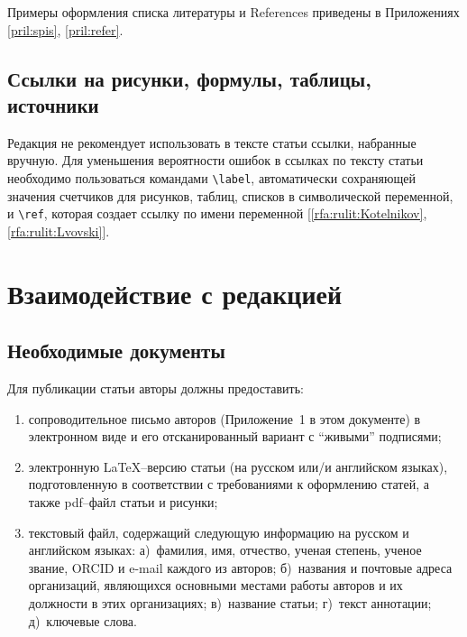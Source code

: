 \documentclass[10pt,a4paper]{book}
\begin{document}
Примеры оформления списка литературы и References приведены в
Приложениях \ref{pril:spis}, \ref{pril:refer}.

\subsection{Ссылки на рисунки, формулы, таблицы, источники}
Редакция не рекомендует использовать в тексте статьи ссылки, набранные вручную.
Для уменьшения вероятности ошибок в ссылках по тексту статьи необходимо
пользоваться командами \verb!\label!, автоматически сохраняющей значения
счетчиков для рисунков, таблиц, списков в символической переменной, 
и \verb!\ref!, которая создает ссылку по имени переменной [\ref{rfa:rulit:Kotelnikov},
\ref{rfa:rulit:Lvovski}].


\section{Взаимодействие с редакцией}

\subsection{Необходимые документы}
Для публикации статьи авторы должны предоставить: 
\begin{enumerate}[itemsep=0pt,parsep=2pt,topsep=2pt,partopsep=0pt]
\renewcommand{\labelenumi}{\arabic{enumi})}
\item сопроводительное письмо авторов (Приложение~1 в этом документе) в электронном виде и его отсканированный вариант с ``живыми'' подписями;
\item электронную \LaTeX--версию статьи (на русском или/и английском языках), 
      подготовленную в соответствии с требованиями к оформлению статей, 
      а также pdf--файл статьи и рисунки;
\item текстовый файл, содержащий следующую информацию на русском и английском языках:
      а)~фамилия, имя, отчество, ученая степень, ученое звание, ORCID и e-mail каждого из авторов;
      б)~названия и почтовые адреса организаций, являющихся основными местами работы авторов 
      и их должности в этих организациях; в)~название статьи; г)~текст аннотации;
      д)~ключевые слова.
\end{enumerate}
\end{document}
